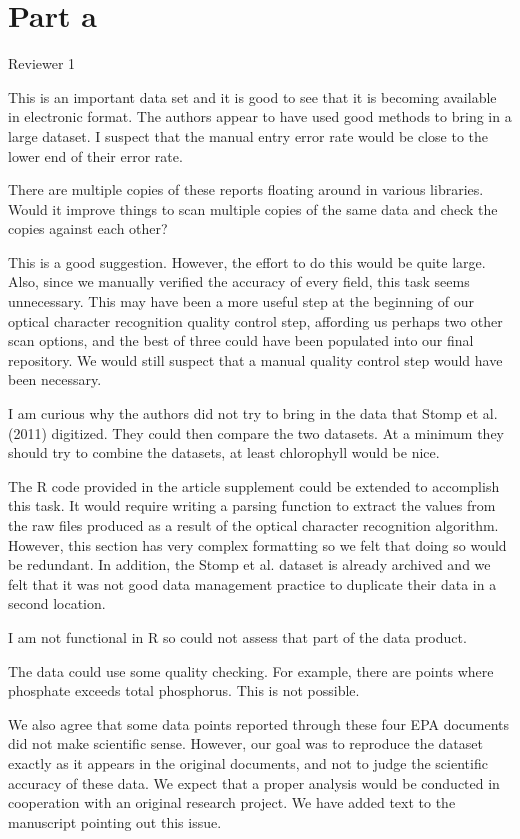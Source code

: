 \documentclass{article}
\begin{document}
\section*{Part a}

Reviewer 1

This is an important data set and it is good to see that it is becoming available in electronic format. The authors appear to have used good methods to bring in a large dataset. I suspect that the manual entry error rate would be close to the lower end of their error rate.

There are multiple copies of these reports floating around in various libraries. Would it improve things to scan multiple copies of the same data and check the copies against each other?

This is a good suggestion. However, the effort to do this would be quite large.  Also, since we manually verified the accuracy of every field, this task seems unnecessary.  This may have been a more useful step at the beginning of our optical character recognition quality control step, affording us perhaps two other scan options, and the best of three could have been populated into our final repository.  We would still suspect that a manual quality control step would have been necessary.

I am curious why the authors did not try to bring in the data that Stomp et al. (2011) digitized. They could then compare the two datasets. At a minimum they should try to combine the datasets, at least chlorophyll would be nice.

The R code provided in the article supplement could be extended to accomplish this task. It would require writing a parsing function to extract the values from the raw files produced as a result of the optical character recognition algorithm. However, this section has very complex formatting so we felt that doing so would be redundant. In addition, the Stomp et al. dataset is already archived and we felt that it was not good data management practice to duplicate their data in a second location. 

I am not functional in R so could not assess that part of the data product.

The data could use some quality checking. For example, there are points where phosphate exceeds total phosphorus. This is not possible. 

We also agree that some data points reported through these four EPA documents did not make scientific sense.  However, our goal was to reproduce the dataset exactly as it appears in the original documents, and not to judge the scientific accuracy of these data.  We expect that a proper analysis would be conducted in cooperation with an original research project. We have added text to the manuscript pointing out this issue.
\end{document}
